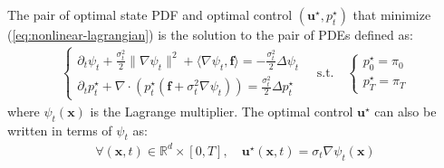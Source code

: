 \documentclass{article}
\begin{document}
\begin{proposition}\label{prop:optimality-nonlinear-sbp}
    The pair of optimal state PDF and optimal control $(\boldsymbol{u}^\star, p^\star_t)$ that minimize (\ref{eq:nonlinear-lagrangian}) is the solution to the pair of PDEs defined as:
    \begin{align}
        \begin{cases}
            \partial_t\psi_t+\frac{\sigma_t^2}{2}\|\nabla\psi_t\|^2+\langle\nabla\psi_t, \boldsymbol{f}\rangle=-\frac{\sigma^2_t}{2}\Delta \psi_t\\
            \partial_t p_t^\star+\nabla\cdot (p_t^\star(\boldsymbol{f}+\sigma^2_t\nabla \psi_t))=\frac{\sigma^2_t}{2}\Delta p^\star_t
        \end{cases}\quad \text{s.t.}\quad \begin{cases}
            p^\star_0=\pi_0\\
            p^\star_T=\pi_T
        \end{cases}\tag{HJB-FP System}\label{eq:prop-hjb-fpe-system}
    \end{align}
    where $\psi_t(\boldsymbol{x})$ is the Lagrange multiplier. The optimal control $\boldsymbol{u}^\star$ can also be written in terms of $\psi_t$ as:
    \begin{align}
        \forall (\boldsymbol{x},t) \in \mathbb{R}^d\times [0, T], \quad \boldsymbol{u}^\star(\boldsymbol{x},t)=\sigma_t\nabla \psi_t(\boldsymbol{x})\label{eq:optimal-u}
    \end{align}
\end{proposition}
\end{document}
